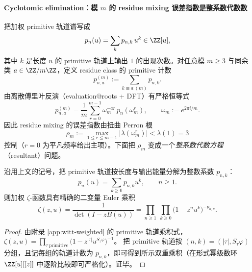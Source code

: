 \paragraph{Cyclotomic elimination：模 \texorpdfstring{$m$}{m} 的 residue mixing 误差指数是整系数代数数}
把加权 primitive 轨道谱写成
\[
p_n(u)=\sum_{k}p_{n,k}\,u^k\in\ZZ[u],
\]
其中 $k$ 是长度 $n$ 的 primitive 轨道上输出 $1$ 的出现次数。对任意模 $m\ge 3$ 与同余类 $a\in\ZZ/m\ZZ$，定义 residue class 的 primitive 计数
\[
p_{n,a}^{(m)}:=\sum_{k\equiv a\ (m)}p_{n,k}.
\]
由离散傅里叶反演（evaluation@roots + DFT）有严格恒等式
\[
p_{n,a}^{(m)}=\frac{1}{m}\sum_{r=0}^{m-1}\omega_m^{-ar}\,p_n(\omega_m^r),
\qquad \omega_m:=e^{2\pi i/m}.
\]
因此 residue mixing 的误差指数由扭曲 Perron 根
\[
\rho_m:=\max_{1\le r\le m-1}|\lambda(\omega_m^r)|<\lambda(1)=3
\]
控制（$r=0$ 为平凡频率给出主项）。下面把 $\rho_m$ 变成一个\emph{整系数代数方程}（resultant）问题。

\begin{proposition}[能量分辨的 Euler 乘积：\texorpdfstring{$\zeta(z,u)=\prod_{n,k}(1-z^n u^k)^{-p_{n,k}}$}{zeta(z,u)=prod(1-z^n u^k)^(-p_{n,k})}]\label{prop:sync-bivariate-euler-product}
沿用上文的记号，把 primitive 轨道按长度与输出能量分解为整数系数 \(p_{n,k}\)：
\[
p_n(u)=\sum_{k\ge 0}p_{n,k}u^k,\qquad n\ge 1.
\]
则加权 \(\zeta\)-函数具有精确的二变量 Euler 乘积
\[
\zeta(z,u)=\frac{1}{\det(I-zB(u))}
=\prod_{n\ge 1}\ \prod_{k\ge 0}\bigl(1-z^n u^k\bigr)^{-p_{n,k}}.
\]
\end{proposition}
\begin{proof}
由附录 \ref{app:witt-weighted} 的 primitive 轨道乘积式，
\(
\zeta(z,u)=\prod_{\tau\ \mathrm{primitive}}\bigl(1-z^{|\tau|}u^{S_\tau\varphi}\bigr)^{-1}
\)。
把 primitive 轨道按 \((n,k)=(|\tau|,S_\tau\varphi)\) 分组，且记每组的轨道计数为 \(p_{n,k}\)，即可得到所示双重乘积（在形式幂级数环 \(\ZZ[u][[z]]\) 中逐阶比较即可严格化）。证毕。
\end{proof}

